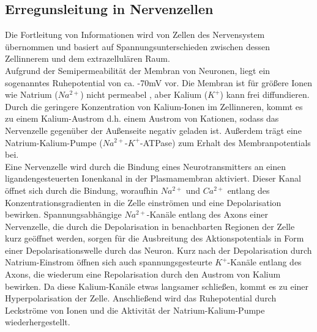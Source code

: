 \documentclass[11pt]{article}
\begin{document}
\subsection{Erregunsleitung in Nervenzellen}
Die Fortleitung von Informationen wird von Zellen des Nervensystem übernommen und basiert auf Spannungsunterschieden zwischen dessen Zellinnerem und dem extrazellulären Raum. \\
Aufgrund der Semipermeabilität der Membran von Neuronen, liegt ein sogenanntes Ruhepotential von ca. -70mV vor. Die Membran ist für größere Ionen wie Natrium ($Na^{2+}$) nicht permeabel , aber Kalium ($K^{+}$) kann frei diffundieren. Durch die geringere Konzentration von Kalium-Ionen im Zellinneren, kommt es zu einem Kalium-Austrom d.h. einem Austrom von Kationen, sodass das Nervenzelle gegenüber der Außenseite negativ geladen ist. Außerdem trägt eine Natrium-Kalium-Pumpe ($Na^{2+}$-$K^+$-ATPase) zum Erhalt des Membranpotentials bei.  \\
Eine Nervenzelle wird durch die Bindung eines Neurotransmitters an einen ligandengesteuerten Ionenkanal in der Plasmamembran aktiviert. Dieser Kanal öffnet sich durch die Bindung, woraufhin $Na^{2+}$ und $Ca^{2+}$ entlang des Konzentrationsgradienten in die Zelle einströmen und eine Depolarisation bewirken. Spannungsabhängige $Na^{2+}$-Kanäle entlang des Axons einer Nervenzelle, die durch die Depolarisation in benachbarten Regionen der Zelle kurz geöffnet werden, sorgen für die Ausbreitung des Aktionspotentials in Form einer Depolarisationswelle durch das Neuron. Kurz nach der Depolarisation durch Natrium-Einstrom öffnen sich auch spannungsgesteurte $K^+$-Kanäle entlang des Axons, die wiederum eine Repolarisation durch den Austrom von Kalium bewirken. Da diese Kalium-Kanäle etwas langsamer schließen, kommt es zu einer Hyperpolarisation der Zelle. Anschließend wird das Ruhepotential durch Leckströme von Ionen und die Aktivität der Natrium-Kalium-Pumpe wiederhergestellt.  \cite{lehninger}
\end{document}
